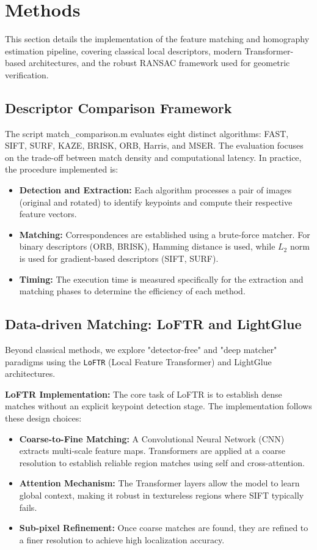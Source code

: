 \documentclass{article}
\begin{document}
\section{Methods}
\label{sec:Methods}

This section details the implementation of the feature matching and homography estimation pipeline, covering classical local descriptors, modern Transformer-based architectures, and the robust RANSAC framework used for geometric verification.

\subsection{Descriptor Comparison Framework}
The script match\_comparison.m evaluates eight distinct algorithms: FAST, SIFT, SURF, KAZE, BRISK, ORB, Harris, and MSER. The evaluation focuses on the trade-off between match density and computational latency. In practice, the procedure implemented is:
\begin{itemize}
    \item \textbf{Detection and Extraction:} Each algorithm processes a pair of images (original and rotated) to identify keypoints and compute their respective feature vectors.
    \item \textbf{Matching:} Correspondences are established using a brute-force matcher. For binary descriptors (ORB, BRISK), Hamming distance is used, while $L_2$ norm is used for gradient-based descriptors (SIFT, SURF).
    \item \textbf{Timing:} The execution time is measured specifically for the extraction and matching phases to determine the efficiency of each method.
\end{itemize}

\subsection{Data-driven Matching: LoFTR and LightGlue}
Beyond classical methods, we explore "detector-free" and "deep matcher" paradigms using the \texttt{LoFTR} (Local Feature Transformer) and LightGlue architectures. 

\textbf{LoFTR Implementation:}
The core task of LoFTR is to establish dense matches without an explicit keypoint detection stage. The implementation follows these design choices:
\begin{itemize}
    \item \textbf{Coarse-to-Fine Matching:} A Convolutional Neural Network (CNN) extracts multi-scale feature maps. Transformers are applied at a coarse resolution to establish reliable region matches using self and cross-attention.
    \item \textbf{Attention Mechanism:} The Transformer layers allow the model to learn global context, making it robust in textureless regions where SIFT typically fails.
    \item \textbf{Sub-pixel Refinement:} Once coarse matches are found, they are refined to a finer resolution to achieve high localization accuracy.
\end{itemize}
\end{document}
